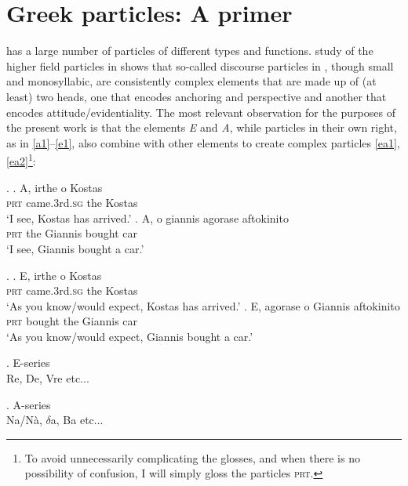 \documentclass[output=paper]{LSP/langsci}
\begin{document}
\section{Greek particles: A primer}
\label{sec3}
 has a large {number} of particles of different types and functions.   study of the higher field particles in  shows that so-called discourse particles in , though small and monosyllabic, are consistently complex elements that are made up of (at least) two heads, one that encodes anchoring and perspective and another that encodes attitude/evidentiality.  The most relevant observation for the purposes of the present work is that the elements \textit{E} and \textit{A}, while particles in their own right, as in \ref{a1}--\ref{e1}, also combine with other elements to create complex particles \ref{ea1}, \ref{ea2}\footnote{To avoid unnecessarily complicating the glosses, and when there is no possibility of confusion, I will simply gloss the particles \textsc{prt}.}:

\Lsciex.  \label{a1}
\ag. A, irthe o Kostas\\
\textsc{prt} came.3rd.\textsc{sg} the Kostas\\ 
\glt `I see, Kostas has arrived.'
\bg. A, o giannis agorase aftokinito\\
\textsc{prt} the Giannis bought car\\ \label{esi}
\glt `I see, Giannis bought a car.'

\Lsciex. \label{e1}
\ag. E, irthe o Kostas\\
\textsc{prt} came.3rd.\textsc{sg} the Kostas\\ 
\glt `As you know/would expect, Kostas has arrived.'
\bg. E, agorase o Giannis aftokinito\\
\textsc{prt} bought the Giannis car\\ \label{esf}
\glt `As you know/would expect, Giannis bought a car.'


\Lsciex. \label{ea1}
E-series\\
Re, De, Vre etc...

\Lsciex. \label{ea2}
A-series\\
Na/Nà, $\delta$a, Ba etc...
\end{document}
